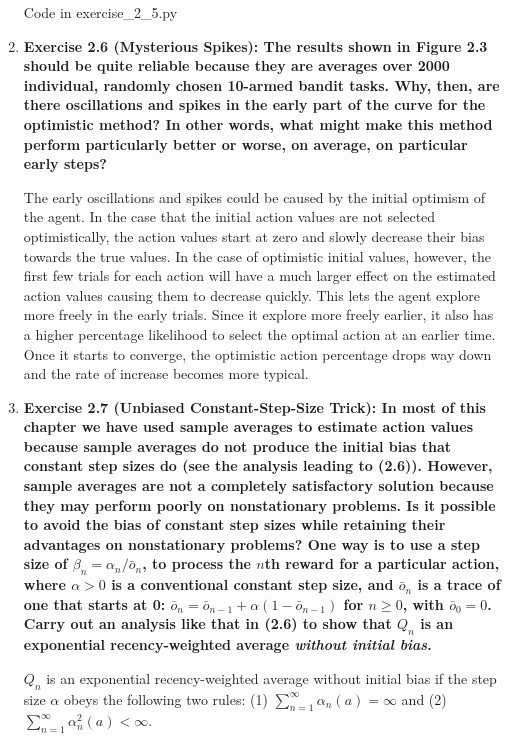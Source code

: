 \documentclass[11pt]{article}
\begin{document}
\begin{enumerate}
		Code in exercise\_2\_5.py
		
		\item \textbf{Exercise 2.6 (Mysterious Spikes): The results shown in Figure 2.3 should be quite reliable because they are averages over 2000 individual, randomly chosen
		10-armed bandit tasks. Why, then, are there oscillations and spikes in the early part of the curve for the optimistic method? In other words, what might make this method
		perform particularly better or worse, on average, on particular early steps?}
		
		The early oscillations and spikes could be caused by the initial optimism of the agent. In the case that the initial action values are not selected optimistically, the
		action values start at zero and slowly decrease their bias towards the true values. In the case of optimistic initial values, however, the first few trials for each action
		will have a much larger effect on the estimated action values causing them to decrease quickly. This lets the agent explore more freely in the early trials. Since it
		explore more freely earlier, it also has a higher percentage likelihood to select the optimal action at an earlier time. Once it starts to converge, the optimistic action
		percentage drops way down and the rate of increase becomes more typical.
		
		\item \textbf{Exercise 2.7 (Unbiased Constant-Step-Size Trick): In most of this chapter we have used sample averages to estimate action values because sample averages do
		not produce the initial bias that constant step sizes do (see the analysis leading to (2.6)). However, sample averages are not a completely satisfactory solution because
		they may perform poorly on nonstationary problems. Is it possible to avoid the bias of constant step sizes while retaining their advantages on nonstationary problems? One
		way is to use a step size of $\beta_n=\alpha_n/\bar{o}_n$, to process the $n$th reward for a particular action, where $\alpha>0$ is a conventional constant step size, and
		$\bar{o}_n$ is a trace of one that starts at 0: $\bar{o}_n=\bar{o}_{n-1}+\alpha(1-\bar{o}_{n-1})$ for $n\geq0$, with $\bar{o}_0=0$. Carry out an analysis like that in
		(2.6) to show that $Q_n$ is an exponential recency-weighted average \textit{without initial bias}.}
		
		$Q_n$ is an exponential recency-weighted average without initial bias if the step size $\alpha$ obeys the following two rules: (1) $\sum_{n=1}^\infty\alpha_n(a)=\infty$
		and (2) $\sum_{n=1}^\infty \alpha^2_n(a)<\infty$.
		

\end{enumerate}
\end{document}
